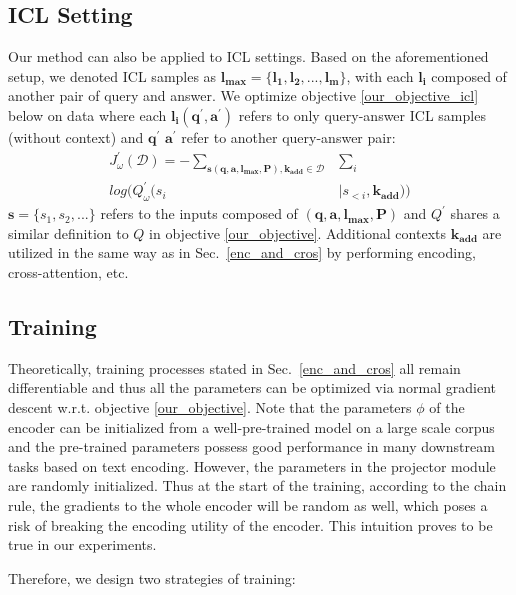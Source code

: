 \subsection{ICL Setting}
\label{icl_setting_sec}

Our method can also be applied to ICL settings. Based on the aforementioned setup, we denoted ICL samples as $\bm{l_{max}} = \{\bm{l_1}, \bm{l_2}, ..., \bm{l_m}\}$, with each $\bm{l_i}$ composed of another pair of query and answer. We optimize objective \ref{our_objective_icl} below on data where each $\bm{l_i}(\bm{q^{'}}, \bm{a^{'}})$ refers to only query-answer ICL samples (without context) and $\bm{q^{'}}$ $\bm{a^{'}}$ refer to another query-answer pair:
\begin{equation}\label{our_objective_icl}
\begin{split}
J^{'}_{\omega}(\mathcal{D}) = - \sum\limits_{ \bm{s}(\bm{q}, \bm{a}, \bm{l_{max}}, \bm{P}), \bm{k_{add}} \in \mathcal{D}} &\sum\limits_{i} \\[4pt]
log(Q^{'}_{\omega}(s_i&|s_{<i}, \bm{k_{add}}))
\end{split}
\end{equation}
$\bm{s}=\{s_1, s_2, ... \}$ refers to the inputs composed of $(\bm{q}, \bm{a}, \bm{l_{max}}, \bm{P})$ and $Q^{'}$ shares a similar definition to $Q$ in objective \ref{our_objective}. Additional contexts $\bm{k_{add}} $ are utilized in the same way as in Sec.~\ref{enc_and_cros} by performing encoding, cross-attention, etc.


\subsection{Training}
\label{training_sec}

Theoretically, training processes stated in Sec.~\ref{enc_and_cros} all remain differentiable and thus all the parameters can be optimized via normal gradient descent w.r.t. objective \ref{our_objective}. Note that the parameters $\phi$ of the encoder can be initialized from a well-pre-trained model on a large scale corpus and the pre-trained parameters possess good performance in many downstream tasks based on text encoding. However, the parameters in the projector module are randomly initialized. Thus at the start of the training, according to the chain rule, the gradients to the whole encoder will be random as well, which poses a risk of breaking the encoding utility of the encoder. This intuition proves to be true in our experiments. 

Therefore, we design two strategies of training:

